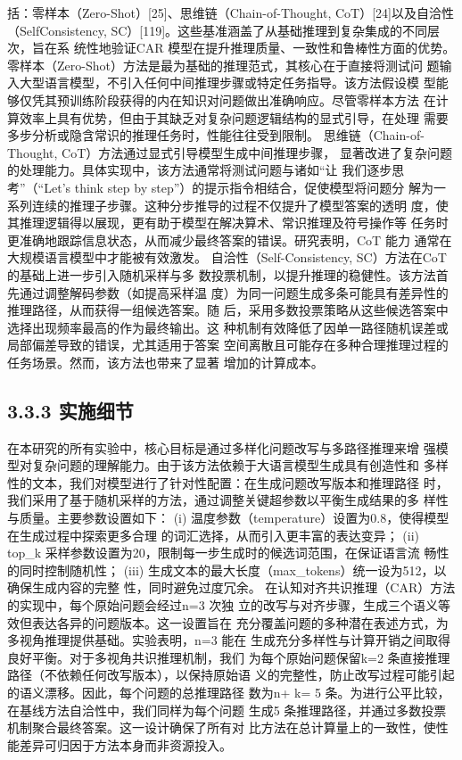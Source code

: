 \documentclass[12pt,a4paper,openright,UTF8]{ctexbook}
\begin{document}
括：零样本（Zero-Shot）[25]、思维链（Chain-of-Thought, CoT）[24]以及自洽性（SelfConsistency, SC）[119]。这些基准涵盖了从基础推理到复杂集成的不同层次，旨在系 统性地验证CAR 模型在提升推理质量、一致性和鲁棒性方面的优势。 零样本（Zero-Shot）方法是最为基础的推理范式，其核心在于直接将测试问 题输入大型语言模型，不引入任何中间推理步骤或特定任务指导。该方法假设模 型能够仅凭其预训练阶段获得的内在知识对问题做出准确响应。尽管零样本方法 在计算效率上具有优势，但由于其缺乏对复杂问题逻辑结构的显式引导，在处理 需要多步分析或隐含常识的推理任务时，性能往往受到限制。 思维链（Chain-of-Thought, CoT）方法通过显式引导模型生成中间推理步骤， 显著改进了复杂问题的处理能力。具体实现中，该方法通常将测试问题与诸如“让 我们逐步思考”（“Let’s think step by step”）的提示指令相结合，促使模型将问题分 解为一系列连续的推理子步骤。这种分步推导的过程不仅提升了模型答案的透明 度，使其推理逻辑得以展现，更有助于模型在解决算术、常识推理及符号操作等 任务时更准确地跟踪信息状态，从而减少最终答案的错误。研究表明，CoT 能力 通常在大规模语言模型中才能被有效激发。 自洽性（Self-Consistency, SC）方法在CoT 的基础上进一步引入随机采样与多 数投票机制，以提升推理的稳健性。该方法首先通过调整解码参数（如提高采样温 度）为同一问题生成多条可能具有差异性的推理路径，从而获得一组候选答案。随 后，采用多数投票策略从这些候选答案中选择出现频率最高的作为最终输出。这 种机制有效降低了因单一路径随机误差或局部偏差导致的错误，尤其适用于答案 空间离散且可能存在多种合理推理过程的任务场景。然而，该方法也带来了显著 增加的计算成本。

\subsection{3.3.3 实施细节}

在本研究的所有实验中，核心目标是通过多样化问题改写与多路径推理来增 强模型对复杂问题的理解能力。由于该方法依赖于大语言模型生成具有创造性和 多样性的文本，我们对模型进行了针对性配置：在生成问题改写版本和推理路径 时，我们采用了基于随机采样的方法，通过调整关键超参数以平衡生成结果的多 样性与质量。主要参数设置如下： (i) 温度参数（temperature）设置为0.8，使得模型在生成过程中探索更多合理 的词汇选择，从而引入更丰富的表达变异； (ii) top\_k 采样参数设置为20，限制每一步生成时的候选词范围，在保证语言流 畅性的同时控制随机性； (iii) 生成文本的最大长度（max\_tokens）统一设为512，以确保生成内容的完整 性，同时避免过度冗余。 在认知对齐共识推理（CAR）方法的实现中，每个原始问题会经过n=3 次独 立的改写与对齐步骤，生成三个语义等效但表达各异的问题版本。这一设置旨在 充分覆盖问题的多种潜在表述方式，为多视角推理提供基础。实验表明，n=3 能在 生成充分多样性与计算开销之间取得良好平衡。对于多视角共识推理机制，我们 为每个原始问题保留k=2 条直接推理路径（不依赖任何改写版本），以保持原始语 义的完整性，防止改写过程可能引起的语义漂移。因此，每个问题的总推理路径 数为n+ k= 5 条。为进行公平比较，在基线方法自洽性中，我们同样为每个问题 生成5 条推理路径，并通过多数投票机制聚合最终答案。这一设计确保了所有对 比方法在总计算量上的一致性，使性能差异可归因于方法本身而非资源投入。
\end{document}
